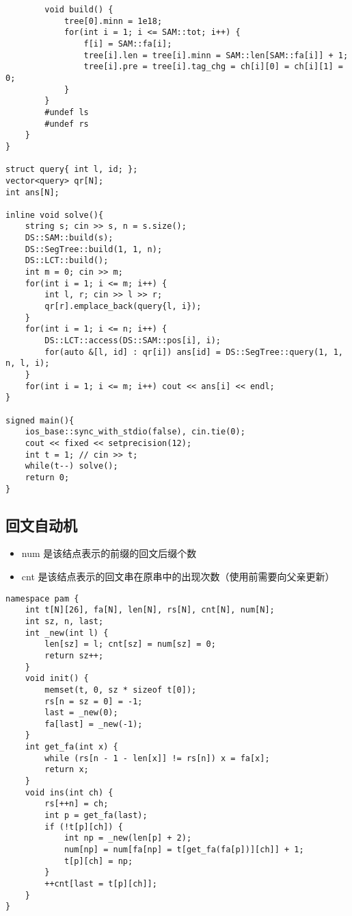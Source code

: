 \documentclass[]{article}
\providecommand{\tightlist}{%
  \setlength{\itemsep}{0pt}\setlength{\parskip}{0pt}}
\begin{document}
\begin{verbatim}
        void build() {
            tree[0].minn = 1e18;
            for(int i = 1; i <= SAM::tot; i++) {
                f[i] = SAM::fa[i];
                tree[i].len = tree[i].minn = SAM::len[SAM::fa[i]] + 1;
                tree[i].pre = tree[i].tag_chg = ch[i][0] = ch[i][1] = 0;
            }
        }
        #undef ls
        #undef rs
    }
}

struct query{ int l, id; };
vector<query> qr[N];
int ans[N];

inline void solve(){
    string s; cin >> s, n = s.size();
    DS::SAM::build(s);
    DS::SegTree::build(1, 1, n);
    DS::LCT::build();
    int m = 0; cin >> m;
    for(int i = 1; i <= m; i++) {
        int l, r; cin >> l >> r;
        qr[r].emplace_back(query{l, i});        
    }
    for(int i = 1; i <= n; i++) {
        DS::LCT::access(DS::SAM::pos[i], i);
        for(auto &[l, id] : qr[i]) ans[id] = DS::SegTree::query(1, 1, n, l, i);
    }
    for(int i = 1; i <= m; i++) cout << ans[i] << endl;
}

signed main(){
    ios_base::sync_with_stdio(false), cin.tie(0);
    cout << fixed << setprecision(12);
    int t = 1; // cin >> t;
    while(t--) solve();
    return 0;
}
\end{verbatim}

\hypertarget{ux56deux6587ux81eaux52a8ux673a}{%
\subsection{回文自动机}\label{ux56deux6587ux81eaux52a8ux673a}}

\begin{itemize}
\tightlist
\item
  num 是该结点表示的前缀的回文后缀个数
\item
  cnt 是该结点表示的回文串在原串中的出现次数（使用前需要向父亲更新）
\end{itemize}

\begin{verbatim}
namespace pam {
    int t[N][26], fa[N], len[N], rs[N], cnt[N], num[N];
    int sz, n, last;
    int _new(int l) {
        len[sz] = l; cnt[sz] = num[sz] = 0;
        return sz++;
    }
    void init() {
        memset(t, 0, sz * sizeof t[0]);
        rs[n = sz = 0] = -1;
        last = _new(0);
        fa[last] = _new(-1);
    }
    int get_fa(int x) {
        while (rs[n - 1 - len[x]] != rs[n]) x = fa[x];
        return x;
    }
    void ins(int ch) {
        rs[++n] = ch;
        int p = get_fa(last);
        if (!t[p][ch]) {
            int np = _new(len[p] + 2);
            num[np] = num[fa[np] = t[get_fa(fa[p])][ch]] + 1;
            t[p][ch] = np;
        }
        ++cnt[last = t[p][ch]];
    }
}
\end{verbatim}
\end{document}
